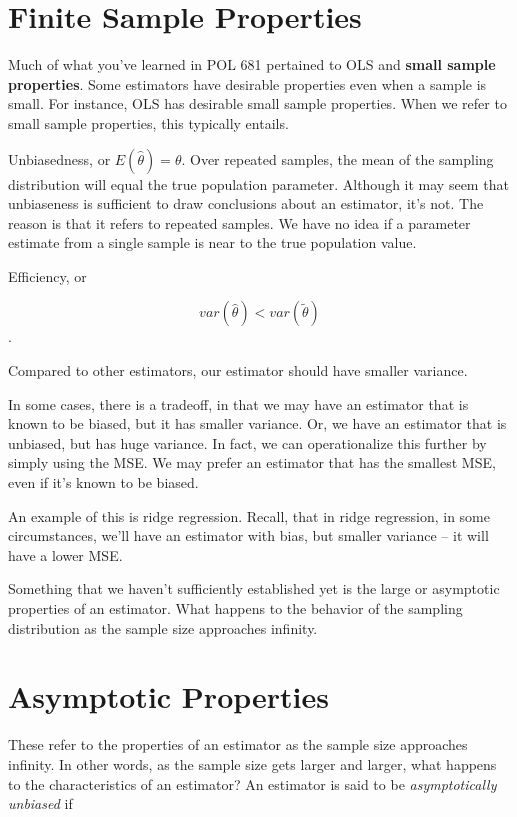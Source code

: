 \documentclass[
]{book}
\begin{document}
\section{Finite Sample Properties}\label{finite-sample-properties}

Much of what you've learned in POL 681 pertained to OLS and \textbf{small sample properties}. Some estimators have desirable properties even when a sample is small. For instance, OLS has desirable small sample properties. When we refer to small sample properties, this typically entails.

Unbiasedness, or \(E(\hat{\theta})=\theta\). Over repeated samples, the mean of the sampling distribution will equal the true population parameter. Although it may seem that unbiaseness is sufficient to draw conclusions about an estimator, it's not. The reason is that it refers to repeated samples. We have no idea if a parameter estimate from a single sample is near to the true population value.

Efficiency, or

\[var(\hat{\theta})<var(\tilde{\theta})\].

Compared to other estimators, our estimator should have smaller variance.

In some cases, there is a tradeoff, in that we may have an estimator that is known to be biased, but it has smaller variance. Or, we have an estimator that is unbiased, but has huge variance. In fact, we can operationalize this further by simply using the MSE. We may prefer an estimator that has the smallest MSE, even if it's known to be biased.

An example of this is ridge regression. Recall, that in ridge regression, in some circumstances, we'll have an estimator with bias, but smaller variance -- it will have a lower MSE.

Something that we haven't sufficiently established yet is the large or asymptotic properties of an estimator. What happens to the behavior of the sampling distribution as the sample size approaches infinity.

\section{Asymptotic Properties}\label{asymptotic-properties}

These refer to the properties of an estimator as the sample size approaches infinity. In other words, as the sample size gets larger and larger, what happens to the characteristics of an estimator? An estimator is said to be \emph{asymptotically unbiased} if
\end{document}
